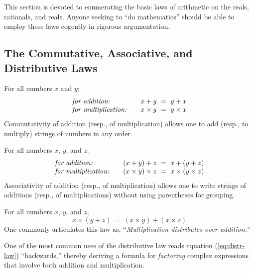 This section is devoted to enumerating the basic laws of arithmetic on
the reals, rationals, and reals.  Anyone seeking to ``do mathematics''
should be able to employ these laws cogently in rigorous argumentation.

\subsection{The Commutative, Associative, and Distributive Laws} 

For all numbers $x$ and $y$:
\[
\begin{array}{llc}
\mbox{\it for addition:}
  & & x+y \ = \ y+x  \index{commutativity of addition} \\
\mbox{\it for multiplication:}
  & & x \times y \ = \ y \times x \index{commutativity of multiplication}
\end{array}
\]
Commutativity of addition (resp., of multiplication) allows one to add
(resp., to multiply) strings of numbers in any order. 

\medskip

For all numbers $x$, $y$, and $z$:
\[
\begin{array}{llc}
\mbox{\it for addition:}
  & &
(x+y)+z \ = \ x+(y+z) \\
\mbox{\it for multiplication:}
  & & 
(x \times y) \times z \ = \ x \times (y \times z)
\end{array}
\] 
Associativity of addition (resp., of multiplication) allows one to
write strings of additions (resp., of multiplications) without using
parentheses for grouping.

\medskip

For all numbers $x$, $y$, and $z$,
\begin{equation}
\label{eq:distr-law}
x \times (y + z) \ = \ (x \times y) + (x \times z)
\end{equation}
One commonly articulates this law as, ``{\em Multiplication
  distributes over addition.}''

\smallskip

One of the most common uses of the distributive law reads equation
(\ref{eq:distr-law}) ``backwards,'' thereby deriving a formula for
{\em factoring}  complex expressions that
involve both addition and multiplication.

